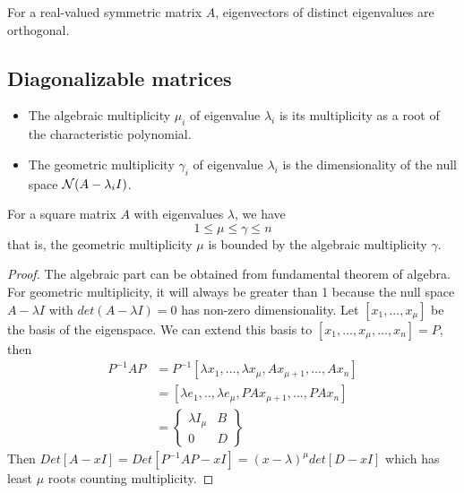\begin{refsection}
 
 
\begin{theorem}\label{ch:linearalgebra:th:EigenvectororthogonalityRealSymmetricMatrix}
 For a real-valued symmetric matrix $A$, eigenvectors of distinct eigenvalues are orthogonal.
\end{theorem}
 
 
 
\subsection{Diagonalizable matrices}
\begin{definition}\hfill
\begin{itemize}
	\item The algebraic multiplicity $\mu_i$ of eigenvalue  $\lambda_i$ is its multiplicity as a root of the characteristic polynomial. 
	\item The geometric multiplicity $\gamma_i$ of eigenvalue $\lambda_i$ is the dimensionality of the null space $\mathcal{N}(A-\lambda_i I)$.
\end{itemize}	
\end{definition}

\begin{theorem}\cite[323]{banerjee2014linear}\label{ch:linearalgebra:boundednessGeometricmultiplicity}
For a square matrix $A$ with eigenvalues $\lambda$, we have
$$1\leq \mu \leq \gamma \leq n$$
that is, the geometric multiplicity $\mu$ is bounded by the algebraic multiplicity $\gamma$.
\end{theorem}
\begin{proof}
The algebraic part can be obtained from fundamental theorem of algebra. For geometric multiplicity, it will always be greater than 1 because the null space $A - \lambda I$ with $det(A - \lambda I) = 0$ has non-zero dimensionality. 
Let $[x_1,...,x_\mu]$ be the basis of the eigenspace. We can extend this basis to $[x_1,...,x_\mu,...,x_n] = P$, then
\begin{align*}
P^{-1}AP &= P^{-1}[\lambda x_1,...,\lambda x_\mu, Ax_{\mu + 1},..., Ax_n]\\
&=[\lambda e_1,..,\lambda e_{\mu}, PAx_{\mu + 1},...,PAx_{n}]\\
&=\begin{Bmatrix}
\lambda I_\mu & B\\
0 & D
\end{Bmatrix}
\end{align*}
Then $Det[A - x I] = Det[P^{-1}AP - x I] = (x-\lambda)^\mu det[D-xI]$
which has least $\mu$ roots counting multiplicity.
\end{proof}
 



\end{refsection}
